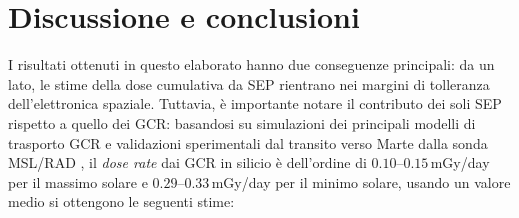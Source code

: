 \documentclass[a4paper,12pt]{article}
\begin{document}
\section*{Discussione e conclusioni}
I risultati ottenuti in questo elaborato hanno due conseguenze principali: da un lato, le stime della dose cumulativa da SEP rientrano nei margini di tolleranza dell'elettronica spaziale. Tuttavia, è importante notare il contributo dei soli SEP rispetto a quello dei GCR: basandosi su simulazioni dei principali modelli di trasporto GCR \cite{ramos2023} e validazioni sperimentali dal transito verso Marte dalla sonda MSL/RAD \cite{Zeitlin2013}, il \textit{dose rate} dai GCR in silicio è dell'ordine di $0.10$--$0.15$\,mGy/day per il massimo solare e $0.29$--$0.33$\,mGy/day per il minimo solare, usando un valore medio si ottengono le seguenti stime:
\end{document}
